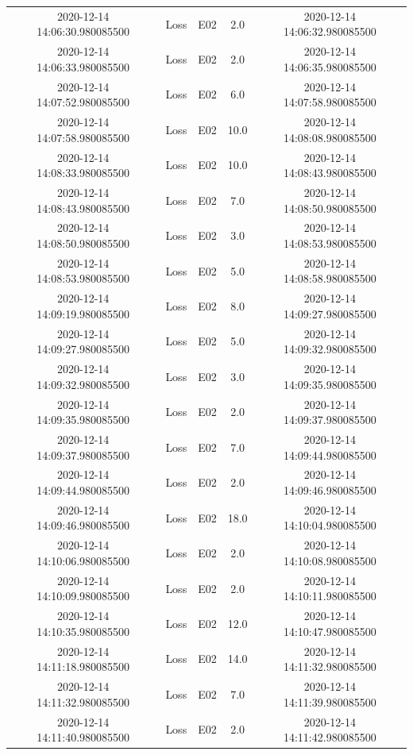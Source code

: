 \begin{enumerate}
\begin{longtabu}{ccccc}
2020{-}12{-}14 14:06:30.980085500&Loss&E02&2.0&2020{-}12{-}14 14:06:32.980085500\\%
2020{-}12{-}14 14:06:33.980085500&Loss&E02&2.0&2020{-}12{-}14 14:06:35.980085500\\%
2020{-}12{-}14 14:07:52.980085500&Loss&E02&6.0&2020{-}12{-}14 14:07:58.980085500\\%
2020{-}12{-}14 14:07:58.980085500&Loss&E02&10.0&2020{-}12{-}14 14:08:08.980085500\\%
2020{-}12{-}14 14:08:33.980085500&Loss&E02&10.0&2020{-}12{-}14 14:08:43.980085500\\%
2020{-}12{-}14 14:08:43.980085500&Loss&E02&7.0&2020{-}12{-}14 14:08:50.980085500\\%
2020{-}12{-}14 14:08:50.980085500&Loss&E02&3.0&2020{-}12{-}14 14:08:53.980085500\\%
2020{-}12{-}14 14:08:53.980085500&Loss&E02&5.0&2020{-}12{-}14 14:08:58.980085500\\%
2020{-}12{-}14 14:09:19.980085500&Loss&E02&8.0&2020{-}12{-}14 14:09:27.980085500\\%
2020{-}12{-}14 14:09:27.980085500&Loss&E02&5.0&2020{-}12{-}14 14:09:32.980085500\\%
2020{-}12{-}14 14:09:32.980085500&Loss&E02&3.0&2020{-}12{-}14 14:09:35.980085500\\%
2020{-}12{-}14 14:09:35.980085500&Loss&E02&2.0&2020{-}12{-}14 14:09:37.980085500\\%
2020{-}12{-}14 14:09:37.980085500&Loss&E02&7.0&2020{-}12{-}14 14:09:44.980085500\\%
2020{-}12{-}14 14:09:44.980085500&Loss&E02&2.0&2020{-}12{-}14 14:09:46.980085500\\%
2020{-}12{-}14 14:09:46.980085500&Loss&E02&18.0&2020{-}12{-}14 14:10:04.980085500\\%
2020{-}12{-}14 14:10:06.980085500&Loss&E02&2.0&2020{-}12{-}14 14:10:08.980085500\\%
2020{-}12{-}14 14:10:09.980085500&Loss&E02&2.0&2020{-}12{-}14 14:10:11.980085500\\%
2020{-}12{-}14 14:10:35.980085500&Loss&E02&12.0&2020{-}12{-}14 14:10:47.980085500\\%
2020{-}12{-}14 14:11:18.980085500&Loss&E02&14.0&2020{-}12{-}14 14:11:32.980085500\\%
2020{-}12{-}14 14:11:32.980085500&Loss&E02&7.0&2020{-}12{-}14 14:11:39.980085500\\%
2020{-}12{-}14 14:11:40.980085500&Loss&E02&2.0&2020{-}12{-}14 14:11:42.980085500\\%

\end{longtabu}
\end{enumerate}
